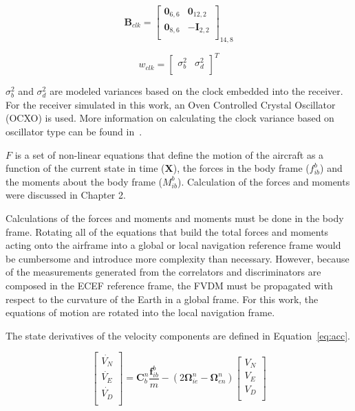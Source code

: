 \begin{equation}\label{eq:Bclk}
    \mathbf{B}_{clk} =\begin{bmatrix}
        \mathbf{0}_{6,6} & \mathbf{0}_{12,2} \\
        \mathbf{0}_{8,6} & -\mathbf{I}_{2,2} \\
    \end{bmatrix}_{14,8}
\end{equation}

\begin{equation}\label{eq:wClk}
    w_{clk} = \begin{bmatrix}
        \sigma^2_b & \sigma^2_d \\
    \end{bmatrix}^T
\end{equation}

\(\sigma^2_b\) and \(\sigma^2_d\) are modeled variances based on the clock embedded into the receiver. For the receiver simulated in this work, an Oven Controlled Crystal Oscillator (OCXO) is used. More information on calculating the clock variance based on oscillator type can be found in~\cite{robertgroverbrownIntroductionRandomSignals2013}.

\(F\) is a set of non-linear equations that define the motion of the aircraft as a function of the current state in time (\(\mathbf{X}\)), the forces in the body frame (\(f_{ib}^b\)) and the moments about the body frame (\(M_{ib}^b\)). Calculation of the forces and moments were discussed in Chapter 2.

Calculations of the forces and moments and moments must be done in the body frame. Rotating all of the equations that build the total forces and moments acting onto the airframe into a global or local navigation reference frame would be cumbersome and introduce more complexity than necessary. However, because of the measurements generated from the correlators and discriminators are composed in the ECEF reference frame, the FVDM must be propagated with respect to the curvature of the Earth in a global frame. For this work, the equations of motion are rotated into the local navigation frame.

The state derivatives of the velocity components are defined in Equation~\ref{eq:acc}.

\begin{equation}\label{eq:acc}
    \begin{bmatrix}
        \dot{V_N} \\
        \dot{V_E} \\
        \dot{V_D} \\
    \end{bmatrix} =
    \mathbf{C}_{b}^{n}\frac{\mathbf{f}_{ib}^b}{m} - \left(2\mathbf{\Omega}_{ie}^n - \mathbf{\Omega}_{en}^n\right)
    \begin{bmatrix}
        V_N \\
        V_E \\
        V_D \\
    \end{bmatrix}
\end{equation}

